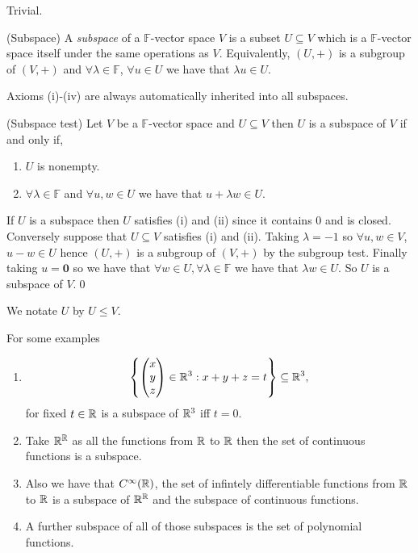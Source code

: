 \documentclass{article}
\newcommand{\F}{\mathbb{F}}
\begin{document}
\pf Trivial.
\begin{definition}
	(Subspace) A \textit{subspace} of a $ \F $-vector space $ V $ is a subset $ U\subseteq V $ which is a $ \F $-vector space itself under the same operations as $ V $. Equivalently, $ (U,+) $ is a subgroup of $ (V,+) $ and $ \forall \lambda\in \F $, $\forall u\in U $ we have that $ \lambda u \in U $.
\end{definition}
\begin{remark}
  Axioms (i)-(iv) are always automatically inherited into all subspaces.
\end{remark}
\begin{proposition}
	(Subspace test) Let $ V $ be a $ \F $-vector space and $ U\subseteq V $ then $ U $ is a subspace of $ V $ if and only if,
	\begin{enumerate}
		\item $ U $ is nonempty.
		\item $ \forall \lambda\in\F $ and $ \forall u,w\in U $ we have that $ u+\lambda w \in U $.
	\end{enumerate}
\end{proposition}
\pf If $ U $ is a subspace then $ U $ satisfies (i) and (ii) since it contains $ 0 $ and is closed. Conversely suppose that $ U\subseteq V $ satisfies (i) and (ii). Taking $ \lambda = -1 $ so $ \forall u,w\in V $, $ u-w\in U $ hence $ (U,+) $ is a subgroup of $ (V,+) $ by the subgroup test. Finally taking $ u=\boldsymbol 0 $ so we have that $ \forall w\in U,\forall\lambda\in \F $ we have that $ \lambda w\in U $. So $ U $ is a subspace of $ V $.\qed\par
We notate $ U $ by $ U\le V $.\par
For some examples
\begin{enumerate}
	\item \[
	\left\{\begin{pmatrix}
			x \\
			y \\
			z \\
	\end{pmatrix}\in \mathbb{R}^3:x+y+z=t\right\}\subseteq \mathbb{R}^3, 
\]
for fixed $ t\in \mathbb{R} $ is a subspace of $ \mathbb{R}^3 $ iff $ t = 0 $.\par
\item Take $ \mathbb{R}^{\mathbb{R}} $ as all the functions from $ \mathbb{R} $ to $ \mathbb{R} $ then the set of continuous functions is a subspace.
\item Also we have that $ C^\infty(\mathbb{R}) $, the set of infintely differentiable functions from $ \mathbb{R} $ to $ \mathbb{R} $ is a subspace of $ \mathbb{R}^{\mathbb{R}} $ and the subspace of continuous functions.
\item A further subspace of all of those subspaces is the set of polynomial functions.
\end{enumerate}
\end{document}
